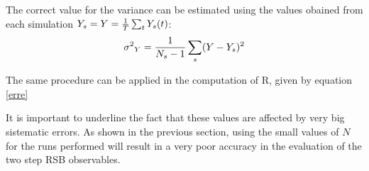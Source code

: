 The correct value for the variance can be estimated using the values obained from each simulation $Y_s = Y = {1\over T}\sum_t Y_s(t)$:
\begin{equation}
{\sigma^2}_Y={1\over N_s - 1} \sum_s (Y-Y_s)^2
\end{equation}

The same procedure can be applied in the computation of R, given by equation \ref{erre}

It is important to underline the fact that these values are affected by very big sistematic errors. As shown in the previous section, using the small values of $N$ for the runs performed will result in a very poor accuracy in the evaluation of the two step RSB observables.




